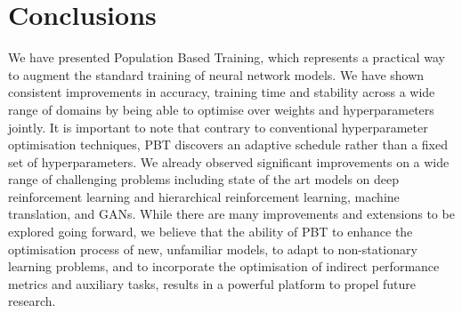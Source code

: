 
\section{Conclusions}\label{sec:conclusion}


We have presented Population Based Training, which represents a practical way to augment the standard training of neural network models. We have shown consistent improvements in accuracy, training time and stability across a wide range of domains by being able to optimise over weights and hyperparameters jointly. It is important to note that contrary to conventional hyperparameter optimisation techniques, PBT discovers an adaptive schedule rather than a fixed set of hyperparameters. We already observed significant improvements on a wide range of challenging problems including state of the art models on deep reinforcement learning and hierarchical reinforcement learning, machine translation, and GANs. While there are many improvements and extensions to be explored going forward, we believe that the ability of PBT to enhance the optimisation process of new, unfamiliar models, to adapt to non-stationary learning problems, and to incorporate the optimisation of indirect performance metrics and auxiliary tasks, results in a powerful platform to propel future research. 
